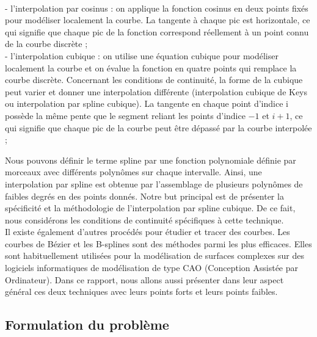 \documentclass{article}
\begin{document}
\\
- l'interpolation par cosinus : on applique la fonction cosinus en deux points fix\'{e}s pour mod\'{e}liser localement la courbe. La tangente \`{a} chaque pic est horizontale, ce qui signifie que chaque pic de la fonction correspond r\'{e}ellement \`{a} un point connu de la courbe discr\`{e}te ;
\\
- l'interpolation cubique : on utilise une \'{e}quation cubique pour mod\'{e}liser localement la courbe et on \'{e}value la fonction en quatre points qui remplace la courbe discr\`{e}te. Concernant les conditions de continuit\'{e}, la forme de la cubique peut varier et donner une interpolation diff\'{e}rente (interpolation cubique de Keys ou interpolation par spline cubique). La tangente en chaque point d'indice i poss\`{e}de la m\^{e}me pente que le segment reliant les points d'indice $-1$ et $i+1$, ce qui signifie que chaque pic de la courbe peut \^{e}tre d\'{e}pass\'{e} par la courbe interpol\'{e}e ;
\par
	Nous pouvons d\'{e}finir le terme spline par une fonction polynomiale d\'{e}finie par morceaux avec diff\'{e}rents polyn\^{o}mes sur chaque intervalle. Ainsi, une interpolation par spline est obtenue par l'assemblage de plusieurs polyn\^{o}mes de faibles degr\'{e}s en des points donn\'{e}s. Notre but principal est de pr\'{e}senter la sp\'{e}cificit\'{e} et la m\'{e}thodologie de l'interpolation par spline cubique. De ce fait, nous consid\'{e}rons les conditions de continuit\'{e} sp\'{e}cifiques \`{a} cette technique.
\\
\indent
	Il existe \'{e}galement d'autres proc\'{e}d\'{e}s pour \'{e}tudier et tracer des courbes. Les courbes de B\'{e}zier et les B-splines sont des m\'{e}thodes parmi les plus efficaces. Elles sont habituellement utilis\'{e}es pour la mod\'{e}lisation de surfaces complexes sur des logiciels informatiques de mod\'{e}lisation de type CAO (Conception Assist\'{e}e par Ordinateur). Dans ce rapport, nous allons aussi pr\'{e}senter dans leur aspect g\'{e}n\'{e}ral ces deux techniques avec leurs points forts et leurs points faibles.

\subsection{Formulation du probl\`{e}me}
\end{document}

